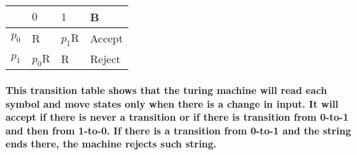 \documentclass[12pt]{article}
\begin{document}
\begin{table}[h]
    \centering
    \begin{tabular}{|l|l|l|l|}
    \hline
    \rowcolor[HTML]{C0C0C0} 
    \cellcolor[HTML]{EFEFEF}      & $0$     & $1$     & B \\ \hline
    \cellcolor[HTML]{C0C0C0} $p_0$&  R      &  $p_1$R & Accept \\ \hline
    \cellcolor[HTML]{C0C0C0} $p_1$&  $p_0$R &  R      & Reject \\ \hline
    \end{tabular}
\end{table}

\paragraph{This transition table shows that the turing machine will read each symbol and move states only when there is a change in input. It will accept if there is never a transition or if there is transition from 0-to-1 and then from 1-to-0. If there is a transition from 0-to-1 and the string ends there, the machine rejects such string.}
\end{document}
